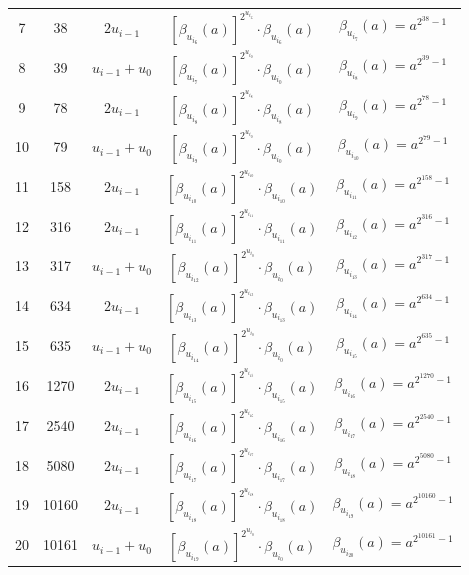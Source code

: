 \documentclass[preprint]{iacrtrans}
\begin{document}
\begin{table}[!tb]
\begin{tabular}{ccccc}
  7   & 38  & $2u_{i-1}$ &$[\beta_{u_{i_6}}(a)]^{2^{u_{i_6}}}\cdot \beta_{u_{i_6}}(a)$ & $\beta_{u_{i_7}}(a)=a^{2^{38}-1}$\\
  8   & 39  & $u_{i-1}+u_0$   &$[\beta_{u_{i_7}}(a)]^{2^{u_{i_0}}}\cdot \beta_{u_{i_0}}(a)$ & $\beta_{u_{i_8}}(a)=a^{2^{39}-1}$\\
  9   & 78  & $2u_{i-1}$ &$[\beta_{u_{i_8}}(a)]^{2^{u_{i_8}}}\cdot \beta_{u_{i_8}}(a)$ & $\beta_{u_{i_9}}(a)=a^{2^{78}-1}$\\
  10  & 79  & $u_{i-1}+u_0$   &$[\beta_{u_{i_9}}(a)]^{2^{u_{i_0}}}\cdot \beta_{u_{i_0}}(a)$ & $\beta_{u_{i_{10}}}(a)=a^{2^{79}-1}$\\
  11  & 158  & $2u_{i-1}$ &$[\beta_{u_{i_{10}}}(a)]^{2^{u_{i_{10}}}}\cdot \beta_{u_{i_{10}}}(a)$ & $\beta_{u_{i_{11}}}(a)=a^{2^{158}-1}$\\
  12  & 316  & $2u_{i-1}$ &$[\beta_{u_{i_{11}}}(a)]^{2^{u_{i_{11}}}}\cdot \beta_{u_{i_{11}}}(a)$ & $\beta_{u_{i_{12}}}(a)=a^{2^{316}-1}$\\
  13  & 317  & $u_{i-1}+u_0$   &$[\beta_{u_{i_{12}}}(a)]^{2^{u_{i_0}}}\cdot \beta_{u_{i_0}}(a)$ & $\beta_{u_{i_{13}}}(a)=a^{2^{317}-1}$\\
  14  & 634  & $2u_{i-1}$ &$[\beta_{u_{i_{13}}}(a)]^{2^{u_{i_{13}}}}\cdot \beta_{u_{i_{13}}}(a)$ & $\beta_{u_{i_{14}}}(a)=a^{2^{634}-1}$\\
  15  & 635  & $u_{i-1}+u_0$   &$[\beta_{u_{i_{14}}}(a)]^{2^{u_{i_0}}}\cdot \beta_{u_{i_0}}(a)$ & $\beta_{u_{i_{15}}}(a)=a^{2^{635}-1}$\\
  16  & 1270  & $2u_{i-1}$ &$[\beta_{u_{i_{15}}}(a)]^{2^{u_{i_{15}}}}\cdot \beta_{u_{i_{15}}}(a)$ & $\beta_{u_{i_{16}}}(a)=a^{2^{1270}-1}$\\
  17  & 2540  & $2u_{i-1}$ &$[\beta_{u_{i_{16}}}(a)]^{2^{u_{i_{16}}}}\cdot \beta_{u_{i_{16}}}(a)$ & $\beta_{u_{i_{17}}}(a)=a^{2^{2540}-1}$\\
  18  & 5080  & $2u_{i-1}$ &$[\beta_{u_{i_{17}}}(a)]^{2^{u_{i_{17}}}}\cdot \beta_{u_{i_{17}}}(a)$ & $\beta_{u_{i_{18}}}(a)=a^{2^{5080}-1}$\\
  19  & 10160 & $2u_{i-1}$ &$[\beta_{u_{i_{18}}}(a)]^{2^{u_{i_{18}}}}\cdot \beta_{u_{i_{18}}}(a)$ & $\beta_{u_{i_{19}}}(a)=a^{2^{10160}-1}$\\
  20  & 10161 & $u_{i-1}+u_0$ &$[\beta_{u_{i_{19}}}(a)]^{2^{u_{i_{0}}}}\cdot \beta_{u_{i_{0}}}(a)$ & $\beta_{u_{i_{20}}}(a)=a^{2^{10161}-1}$\\
  \hline
\end{tabular}
\end{table}
\end{document}
